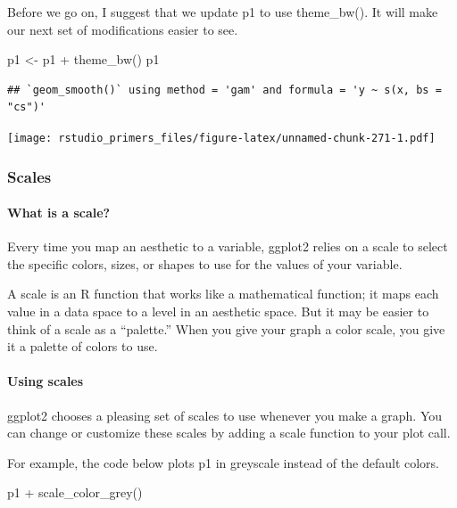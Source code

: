 \documentclass[
]{article}
\newenvironment{Shaded}{\begin{snugshade}}{\end{snugshade}}
\newcommand{\FunctionTok}[1]{\textcolor[rgb]{0.00,0.00,0.00}{#1}}
\newcommand{\NormalTok}[1]{#1}
\newcommand{\OtherTok}[1]{\textcolor[rgb]{0.56,0.35,0.01}{#1}}
\newcommand{\SpecialCharTok}[1]{\textcolor[rgb]{0.00,0.00,0.00}{#1}}
\begin{document}
Before we go on, I suggest that we update p1 to use theme\_bw(). It will
make our next set of modifications easier to see.

\begin{Shaded}
\begin{Highlighting}[]
\NormalTok{p1 }\OtherTok{\textless{}{-}}\NormalTok{ p1 }\SpecialCharTok{+} \FunctionTok{theme\_bw}\NormalTok{()}
\NormalTok{p1}
\end{Highlighting}
\end{Shaded}

\begin{verbatim}
## `geom_smooth()` using method = 'gam' and formula = 'y ~ s(x, bs = "cs")'
\end{verbatim}

\texttt{[image: rstudio\_primers\_files/figure-latex/unnamed-chunk-271-1.pdf]}

\hypertarget{scales-1}{%
\subsubsection{Scales}\label{scales-1}}

\hypertarget{what-is-a-scale}{%
\paragraph{What is a scale?}\label{what-is-a-scale}}

Every time you map an aesthetic to a variable, ggplot2 relies on a scale
to select the specific colors, sizes, or shapes to use for the values of
your variable.

A scale is an R function that works like a mathematical function; it
maps each value in a data space to a level in an aesthetic space. But it
may be easier to think of a scale as a ``palette.'' When you give your
graph a color scale, you give it a palette of colors to use.

\hypertarget{using-scales}{%
\paragraph{Using scales}\label{using-scales}}

ggplot2 chooses a pleasing set of scales to use whenever you make a
graph. You can change or customize these scales by adding a scale
function to your plot call.

For example, the code below plots p1 in greyscale instead of the default
colors.

\begin{Shaded}
\begin{Highlighting}[]
\NormalTok{p1 }\SpecialCharTok{+} \FunctionTok{scale\_color\_grey}\NormalTok{()}
\end{Highlighting}
\end{Shaded}
\end{document}
